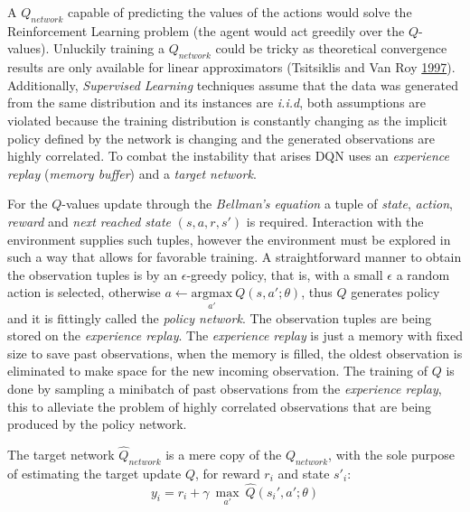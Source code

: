 \documentclass[
  12pt,
  openany]{book}
\begin{document}
A \(Q_{network}\) capable of predicting the values of the actions would solve the Reinforcement Learning problem (the agent would act greedily over the \(Q\)-values). Unluckily training a \(Q_{network}\) could be tricky as theoretical convergence results are only available for linear approximators (Tsitsiklis and Van Roy \protect\hyperlink{ref-tsitsiklis1997analysis}{1997}). Additionally, \emph{Supervised Learning} techniques assume that the data was generated from the same distribution and its instances are \emph{i.i.d}, both assumptions are violated because the training distribution is constantly changing as the implicit policy defined by the network is changing and the generated observations are highly correlated. To combat the instability that arises DQN uses an \emph{experience replay} (\emph{memory buffer}) and a \emph{target network}.

For the \(Q\)-values update through the \emph{Bellman's equation} a tuple of \emph{state}, \emph{action}, \emph{reward} and \emph{next reached state} \((s,a,r,s')\) is required. Interaction with the environment supplies such tuples, however the environment must be explored in such a way that allows for favorable training. A straightforward manner to obtain the observation tuples is by an \(\epsilon\)-greedy policy, that is, with a small \(\epsilon\) a random action is selected, otherwise \(a \leftarrow \underset{a'}{\text{argmax}}\ Q(s,a';\theta)\), thus \(Q\) generates policy and it is fittingly called the \emph{policy network}. The observation tuples are being stored on the \emph{experience replay}. The \emph{experience replay} is just a memory with fixed size to save past observations, when the memory is filled, the oldest observation is eliminated to make space for the new incoming observation. The training of \(Q\) is done by sampling a minibatch of past observations from the \emph{experience replay}, this to alleviate the problem of highly correlated observations that are being produced by the policy network.

The target network \(\hat{Q}_{network}\) is a mere copy of the \(Q_{network}\), with the sole purpose of estimating the target update \(Q\), for reward \(r_i\) and state \(s'_i\):
\[y_i = r_i + \gamma\ \underset{a'}{\max}\ \hat{Q}(s_i',a';\theta)\]
\end{document}
